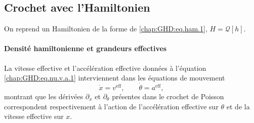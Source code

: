 \medskip

\subsection{Crochet avec l’Hamiltonien}

On reprend un Hamiltonien de la forme de \eqref{chap:GHD:eq.ham.1},  $H = \mathcal{Q}[h]$. 

\paragraph{Densité hamiltonienne et grandeurs effectives} 


La vitesse effective et l'accélération effective données à l'équation \eqref{chap:GHD:eq.nu.v.a.1} interviennent dans les équations de mouvement
\begin{equation}\label{chap:GHD:eq.nu.v.a.1.1}
	\dot{x} = v^{\mathrm{eff}}, \qquad \dot{\theta} = a^{\mathrm{eff}},
\end{equation}
montrant que les dérivées $\partial_x$ et $\partial_\theta$ présentes dans le crochet de Poisson correspondent respectivement à l'action de l'accélération effective sur $\theta$ et de la vitesse effective sur $x$.

\medskip 

